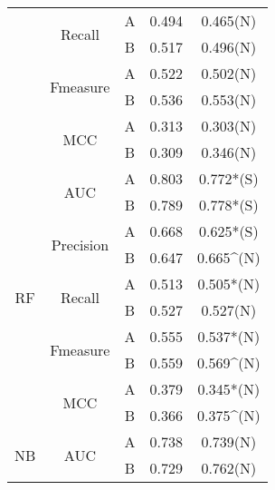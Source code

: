 \begin{table}[t!]
{\begin{tabular}{|c|c|c|c|c|}
                      & \multirow{2}{*}{Recall}    & A & 0.494 & 0.465(N)                   \\ \cline{3-5} 
                      &                            & B & 0.517 & 0.496(N)                   \\ \cline{2-5} 
                      & \multirow{2}{*}{Fmeasure}  & A & 0.522 & 0.502(N)                   \\ \cline{3-5} 
                      &                            & B & 0.536 & 0.553(N)                   \\ \cline{2-5} 
                      & \multirow{2}{*}{MCC}       & A & 0.313 & 0.303(N)                   \\ \cline{3-5} 
                      &                            & B & 0.309 & 0.346(N)                   \\ \hline
\multirow{10}{*}{RF}  & \multirow{2}{*}{AUC}       & A & 0.803 & 0.772*(S)                  \\ \cline{3-5} 
                      &                            & B & 0.789 & 0.778*(S)                  \\ \cline{2-5} 
                      & \multirow{2}{*}{Precision} & A & 0.668 & 0.625*(S)                  \\ \cline{3-5} 
                      &                            & B & 0.647 & 0.665\textasciicircum{}(N) \\ \cline{2-5} 
                      & \multirow{2}{*}{Recall}    & A & 0.513 & 0.505*(N)                  \\ \cline{3-5} 
                      &                            & B & 0.527 & 0.527(N)                   \\ \cline{2-5} 
                      & \multirow{2}{*}{Fmeasure}  & A & 0.555 & 0.537*(N)                  \\ \cline{3-5} 
                      &                            & B & 0.559 & 0.569\textasciicircum{}(N) \\ \cline{2-5} 
                      & \multirow{2}{*}{MCC}       & A & 0.379 & 0.345*(N)                  \\ \cline{3-5} 
                      &                            & B & 0.366 & 0.375\textasciicircum{}(N) \\ \hline
\multirow{10}{*}{NB}  & \multirow{2}{*}{AUC}       & A & 0.738 & 0.739(N)                   \\ \cline{3-5} 
                      &                            & B & 0.729 & 0.762(N)                   \\ \cline{2-5} 

\end{tabular}}
\end{table}
